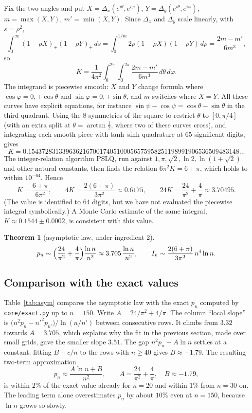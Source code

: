 \documentclass[11pt,a4paper]{article}
\newtheorem*{theorem*}{Theorem}
\theoremstyle{remark}
\begin{document}
Fix the two angles and put $X=\Delta_x(e^{i\theta},e^{i\varphi})$,
$Y=\Delta_y(e^{i\theta},e^{i\varphi})$, $m=\max(X,Y)$, $m'=\min(X,Y)$. Since
$\Delta_x$ and $\Delta_y$ scale linearly, with $s=\rho^2$,
\[
  \int_0^\infty(1-\rho X)_+(1-\rho Y)_+\,ds
  =\int_0^{1/m}2\rho(1-\rho X)(1-\rho Y)\,d\rho
  =\frac{2m-m'}{6m^3},
\]
so
\[
  K=\frac1{4\pi^2}\int_0^{2\pi}\!\!\int_0^{2\pi}\frac{2m-m'}{6m^3}\,d\theta\,d\varphi .
\]
The integrand is piecewise smooth: $X$ and $Y$ change formula where
$\cos\varphi=0,\pm\cos\theta$ and $\sin\varphi=0,\pm\sin\theta$, and $m$ switches
where $X=Y$. All these curves have explicit equations, for instance
$\sin\psi-\cos\psi=\cos\theta-\sin\theta$ in the third quadrant. Using the $8$
symmetries of the square to restrict $\theta$ to $[0,\pi/4]$ (with an extra split
at $\theta=\arctan\frac12$, where two of these curves cross), and integrating each
smooth piece with tanh--sinh quadrature at $65$ significant digits, gives
\[
  K=0.15437283133963621670017405100056575958251198991906536509483148\ldots
\]
The integer-relation algorithm PSLQ, run against $1,\pi,\sqrt2,\ln2,\ln(1+\sqrt2)$ and
other natural constants, then finds the relation $6\pi^2K=6+\pi$, which holds to
within $10^{-64}$. Hence
\[
  K=\frac{6+\pi}{6\pi^2},\qquad 4K=\frac{2(6+\pi)}{3\pi^2}\approx0.6175,\qquad
  24K=\frac{24}{\pi^2}+\frac4\pi\approx3.70495 .
\]
(The value is identified to $64$ digits, but we have not evaluated the piecewise
integral symbolically.) A Monte Carlo estimate of the same integral,
$K\approx0.1544\pm0.0002$, is consistent with this value.

\begin{theorem*}[asymptotic law, under ingredient 2]
\[
  p_n\sim\Bigl(\frac{24}{\pi^2}+\frac4\pi\Bigr)\frac{\ln n}{n^2}
  \approx3.705\,\frac{\ln n}{n^2},
  \qquad
  I_n\sim\frac{2(6+\pi)}{3\pi^2}\,n^4\ln n .
\]
\end{theorem*}

\subsection{Comparison with the exact values}

Table~\ref{tab:asym} compares the asymptotic law with the exact $p_n$ computed by
\texttt{core/exact.py} up to $n=150$. Write $A=24/\pi^2+4/\pi$. The column ``local
slope'' is $\bigl(n^2p_n-n'^2p_{n'}\bigr)/\ln(n/n')$ between consecutive rows. It
climbs from $3.32$ towards $A=3.705$, which explains why the fit in the previous
section, made over small grids, gave the smaller slope $3.51$. The gap
$n^2p_n-A\ln n$ settles at a constant: fitting $B+c/n$ to the rows with $n\ge40$
gives $B\approx-1.79$. The resulting two-term approximation
\[
  p_n\approx\frac{A\ln n+B}{n^2},\qquad A=\frac{24}{\pi^2}+\frac4\pi,\quad
  B\approx-1.79,
\]
is within $2\%$ of the exact value already for $n=20$ and within $1\%$ from
$n=30$ on. The leading term alone overestimates $p_n$ by about $10\%$ even at
$n=150$, because $\ln n$ grows so slowly.
\end{document}
